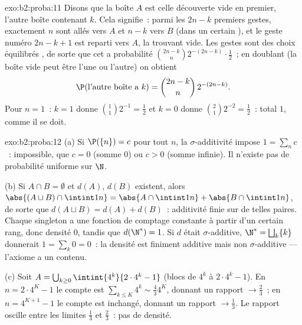 \begin{solution}{exo:b2:proba:11}
Disons que la boîte $A$ est celle découverte vide en premier, l'autre
boîte contenant $k$. Cela signifie~: parmi les $2n - k$
premiers gestes, exactement $n$ sont allés vers $A$ et $n - k$ vers $B$ (dans un
certain ), et le geste numéro $2n - k + 1$ est reparti vers $A$,
la trouvant vide. Les gestes sont des choix équilibrés ,
de sorte que cet  a probabilité
$\binom{2n-k}{n}2^{-(2n-k)}\cdot\frac12$~; en doublant (la boîte vide
peut être l'une ou l'autre) on obtient
\[
\P(\text{l'autre boîte a }k) = \binom{2n-k}{n}\,2^{-(2n-k)} .
\]
Pour $n = 1$~: $k = 1$ donne $\binom11 2^{-1} = \frac12$ et $k
= 0$ donne $\binom21 2^{-2} = \frac12$~: total $1$, comme il se doit.
\end{solution}

\begin{solution}{exo:b2:proba:12}
(a) Si $\P(\{n\}) = c$ pour tout $n$, la $\sigma$-additivité
impose $1 = \sum_nc$~: impossible, que $c = 0$ (somme $0$)
ou $c > 0$ (somme infinie). Il n'existe pas de probabilité uniforme sur
$\N$.

(b) Si $A \cap B = \emptyset$ et $d(A)$, $d(B)$ existent, alors
$\abs{(A \sqcup B)\cap\intint1n} = \abs{A\cap\intint1n} +
\abs{B\cap\intint1n}$, de sorte que $d(A \sqcup B) = d(A) + d(B)$~:
additivité finie sur de telles paires. Chaque singleton a une fonction
de comptage constante à partir d'un certain rang, donc densité $0$, tandis que
$d(\N^*) = 1$. Si $d$ était $\sigma$-additive, $\N^* =
\bigsqcup_k\{k\}$ donnerait $1 = \sum_k 0 = 0$~: la densité est
finiment additive mais non $\sigma$-additive --- l'axiome a un
contenu.

(c) Soit $A = \bigcup_{k\geq0}\intint{4^k}{2\cdot4^k - 1}$
(blocs de $4^k$ à $2\cdot4^k - 1$). En $n = 2\cdot4^K -
1$ le compte est $\sum_{k\leq K}4^k \sim \frac43 4^K$, donnant
un rapport $\to \frac23$~; en $n = 4^{K+1} - 1$ le compte est
inchangé, donnant un rapport $\to \frac13$. Le rapport oscille
entre les limites $\frac13$ et $\frac23$~: pas de densité.
\end{solution}

